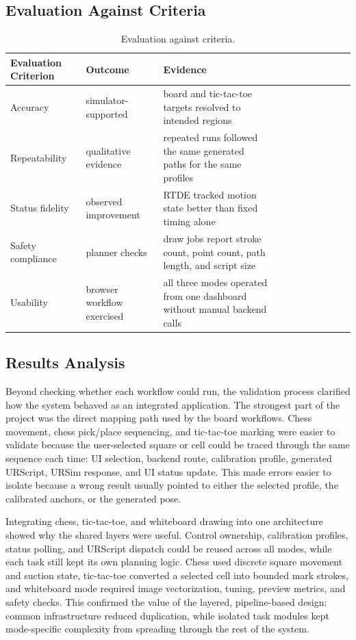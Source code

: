 \documentclass[12pt]{article}
\newcommand{\tablegridon}{\arrayrulecolor{black!35}}
\newcommand{\tablegridoff}{\arrayrulecolor{black}}
\newcommand{\tabrowsep}{\\[0.12em]\hline}
\begin{document}
\subsection{Evaluation Against Criteria}
\begin{table}[H]
\centering
\caption{Evaluation against criteria.}
\label{tab:evaluation}
\small
\tablegridon
\begin{tabularx}{\textwidth}{|L{3.0cm}|L{3.1cm}|Y|}
\toprule
Evaluation Criterion & Outcome & Evidence \\
\midrule
Accuracy & simulator-supported & board and tic-tac-toe targets resolved to intended regions \tabrowsep
Repeatability & qualitative evidence & repeated runs followed the same generated paths for the same profiles \tabrowsep
Status fidelity & observed improvement & RTDE tracked motion state better than fixed timing alone \tabrowsep
Safety compliance & planner checks & draw jobs report stroke count, point count, path length, and script size \tabrowsep
Usability & browser workflow exercised & all three modes operated from one dashboard without manual backend calls \\
\bottomrule
\end{tabularx}
\tablegridoff
\end{table}

\subsection{Results Analysis}
Beyond checking whether each workflow could run, the validation process clarified how the system behaved as an integrated application. The strongest part of the project was the direct mapping path used by the board workflows. Chess movement, chess pick/place sequencing, and tic-tac-toe marking were easier to validate because the user-selected square or cell could be traced through the same sequence each time: UI selection, backend route, calibration profile, generated URScript, URSim response, and UI status update. This made errors easier to isolate because a wrong result usually pointed to either the selected profile, the calibrated anchors, or the generated pose.

Integrating chess, tic-tac-toe, and whiteboard drawing into one architecture showed why the shared layers were useful. Control ownership, calibration profiles, status polling, and URScript dispatch could be reused across all modes, while each task still kept its own planning logic. Chess used discrete square movement and suction state, tic-tac-toe converted a selected cell into bounded mark strokes, and whiteboard mode required image vectorization, tuning, preview metrics, and safety checks. This confirmed the value of the layered, pipeline-based design: common infrastructure reduced duplication, while isolated task modules kept mode-specific complexity from spreading through the rest of the system.
\end{document}
